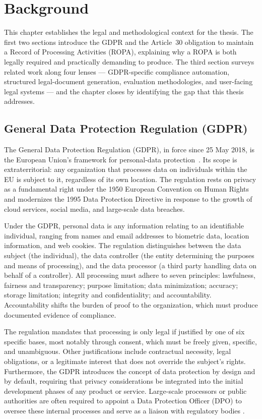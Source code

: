 \chapter{Background}
\label{ch:background}

This chapter establishes the legal and methodological context for
the thesis. The first two sections introduce the GDPR and the
Article~30 obligation to maintain a Record of Processing
Activities (ROPA), explaining why a ROPA is both legally required
and practically demanding to produce. The third section surveys
related work along four lenses --- GDPR-specific compliance
automation, structured legal-document generation, evaluation
methodologies, and user-facing legal systems --- and the chapter
closes by identifying the gap that this thesis addresses.

\section{General Data Protection Regulation (GDPR)}

The General Data Protection Regulation (GDPR), in force since 25 May 2018, is the European Union's framework for personal-data protection~\cite{gdpr-eu-overview}. Its scope is extraterritorial: any organization that processes data on individuals within the EU is subject to it, regardless of its own location. The regulation rests on privacy as a fundamental right under the 1950 European Convention on Human Rights and modernizes the 1995 Data Protection Directive in response to the growth of cloud services, social media, and large-scale data breaches.~\cite{gdpr-eu-overview, gdpr-info-art30}

Under the GDPR, personal data is any information relating to an identifiable individual, ranging from names and email addresses to biometric data, location information, and web cookies. The regulation distinguishes between the data subject (the individual), the data controller (the entity determining the purposes and means of processing), and the data processor (a third party handling data on behalf of a controller). All processing must adhere to seven principles: lawfulness, fairness and transparency; purpose limitation; data minimization; accuracy; storage limitation; integrity and confidentiality; and accountability. Accountability shifts the burden of proof to the organization, which must produce documented evidence of compliance.~\cite{gdpr-eu-overview}

The regulation mandates that processing is only legal if justified by one of six specific bases, most notably through consent, which must be freely given, specific, and unambiguous. Other justifications include contractual necessity, legal obligations, or a legitimate interest that does not override the subject's rights. Furthermore, the GDPR introduces the concept of data protection by design and by default, requiring that privacy considerations be integrated into the initial development phases of any product or service. Large-scale processors or public authorities are often required to appoint a Data Protection Officer (DPO) to oversee these internal processes and serve as a liaison with regulatory bodies \cite{gdpr-eu-overview}.

